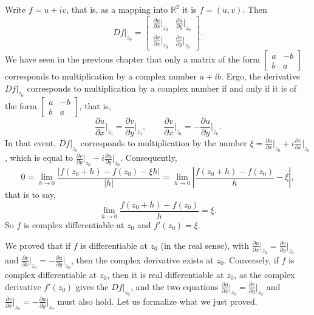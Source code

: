 \documentclass[12pt,openany]{book}
\newcommand{\sabs}[1]{\lvert {#1} \rvert}
\newcommand{\abs}[1]{\left\lvert {#1} \right\rvert}
\newcommand{\R}{{\mathbb{R}}}
\theoremstyle{plain}
\theoremstyle{remark}
\theoremstyle{definition}
\theoremstyle{exercise}
\theoremstyle{example}
\begin{document}
Write $f = u+iv$, that is, as a
mapping into $\R^2$ it is $f = (u,v)$.  Then
\begin{equation*}
Df|_{z_0} =
\begin{bmatrix}
\frac{\partial u}{\partial x}\big|_{z_0} & \frac{\partial u}{\partial
y}\big|_{z_0} \\[5pt]
\frac{\partial v}{\partial x}\big|_{z_0} & \frac{\partial v}{\partial y}\big|_{z_0}
\end{bmatrix} .
\end{equation*}
We have seen in the previous chapter that only a matrix of the form
$\left[ \begin{smallmatrix}
a & -b \\ b & a
\end{smallmatrix} \right]$ corresponds to multiplication
by a complex number $a+ib$.
Ergo, the derivative $Df|_{z_0}$ corresponds to multiplication by a
complex number if and only if it is of the form
$\left[ \begin{smallmatrix}
a & -b \\ b & a
\end{smallmatrix} \right]$, that is,
\begin{equation*}
\frac{\partial u}{\partial x}\Big|_{z_0} =
\frac{\partial v}{\partial y}\Big|_{z_0}
, \qquad
\frac{\partial v}{\partial x}\Big|_{z_0} =
-\frac{\partial u}{\partial y}\Big|_{z_0} .
\end{equation*}
In that event, $Df|_{z_0}$ corresponds to multiplication by the number
$\xi = \frac{\partial u}{\partial x}\big|_{z_0} + i \frac{\partial v}{\partial
x}\big|_{z_0}$, which is equal to
$\frac{\partial v}{\partial y}\big|_{z_0} - i \frac{\partial u}{\partial
y}\big|_{z_0}$.
Consequently,
\begin{equation*}
0 = \lim_{h \to 0} \frac{\sabs{f(z_0+h) - f(z_0) - \xi h}}{\sabs{h}} =
\lim_{h \to 0} \abs{\frac{f(z_0+h) - f(z_0)}{h} - \xi} ,
\end{equation*}
that is to say,
\begin{equation*}
\lim_{h \to 0} \frac{f(z_0+h) - f(z_0)}{h} = \xi .
\end{equation*}
So $f$ is complex differentiable at $z_0$ and $f'(z_0) = \xi$.

We proved that if $f$ is differentiable at $z_0$ (in the real sense),
with
$\frac{\partial u}{\partial x}\big|_{z_0} = \frac{\partial v}{\partial
y}\big|_{z_0}$ and $\frac{\partial v}{\partial x}\big|_{z_0} = -\frac{\partial
u}{\partial y}\big|_{z_0}$, then
the complex derivative exists at $z_0$.
Conversely,
if $f$ is complex differentiable at $z_0$, then it is real
differentiable at $z_0$,
as the complex derivative $f'(z_0)$ gives the $Df|_{z_0}$, and the two
equations 
$\frac{\partial u}{\partial x}\big|_{z_0} = \frac{\partial v}{\partial
y}\big|_{z_0}$ and $\frac{\partial v}{\partial x}\big|_{z_0} = -\frac{\partial
u}{\partial y}\big|_{z_0}$
must also hold.
Let us formalize
what we just proved.
\end{document}

